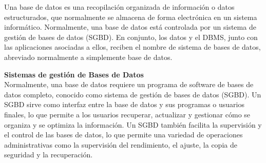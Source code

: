 \vspace{10pt}
Una base de datos es una recopilación organizada de información o datos estructurados, que normalmente se almacena de forma electrónica en un sistema informático. Normalmente, una base de datos está controlada por un sistema de gestión de bases de  datos (SGBD). En conjunto, los datos y el DBMS, junto con las aplicaciones asociadas a ellos, reciben el nombre de sistema de bases de datos, abreviado normalmente a simplemente base de datos.~\cite{Quéesuna68}

\vspace{10pt}
\textbf{Sistemas de gestión de Bases de Datos} \\
Normalmente, una base de datos requiere un programa de software de bases de datos completo, conocido como sistema de gestión de  bases de datos (SGBD). Un SGBD sirve como interfaz entre la base de datos y sus programas o usuarios finales, lo que permite a los  usuarios recuperar, actualizar y gestionar cómo se organiza y se optimiza la información. Un SGBD también facilita la supervisión y el control de las bases de datos, lo que permite una variedad de operaciones administrativas como la supervisión del rendimiento, el ajuste, la copia de seguridad y la recuperación.~\cite{Quéesuna68}

